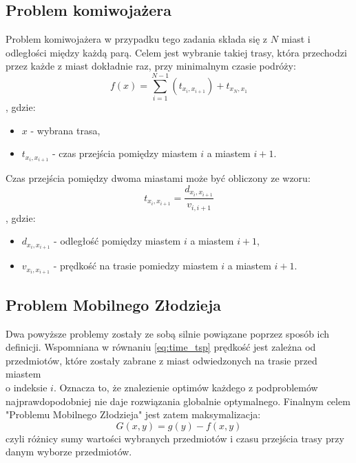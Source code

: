 \documentclass{article}
\begin{document}
	\subsection{Problem komiwojażera}
	Problem komiwojażera w przypadku tego zadania składa się z ${N}$ miast i odległości między każdą parą. Celem jest wybranie takiej trasy, która przechodzi przez każde z miast dokładnie raz, przy minimalnym czasie podróży:
	\begin{equation}\label{eq:min_tsp}
		f(x) = \sum\limits_{i=1}^{N-1}(t_{x_{i},x_{i+1}}) + t_{x_{N},x_{1}}
	\end{equation}
	, gdzie: 
	\begin{itemize}
		\item $x$ - wybrana trasa,
		\item $t_{x_{i},x_{i+1}}$ - czas przejścia pomiędzy miastem $i$ a miastem $i+1$.
	\end{itemize}
	Czas przejścia pomiędzy dwoma miastami może być obliczony ze wzoru:
	\begin{equation}\label{eq:time_tsp}
		t_{x_{i},x_{i+1}} = \dfrac{d_{x_{i}, x_{i+1}}}{v_{i, i+1}}
	\end{equation}
	, gdzie:
	\begin{itemize}
		\item $d_{x_{i},x_{i+1}}$ - odległość pomiędzy miastem $i$ a miastem $i+1$,
		\item $v_{x_{i},x_{i+1}}$ - prędkość na trasie pomiedzy miastem $i$ a miastem $i+1$.
	\end{itemize}
	\subsection{Problem Mobilnego Złodzieja}
	Dwa powyższe problemy zostały ze sobą silnie powiązane poprzez sposób ich definicji. Wspomniana w równaniu \ref{eq:time_tsp} prędkość jest zależna od przedmiotów, które zostały zabrane z miast odwiedzonych na trasie przed miastem \\o indeksie $i$. Oznacza to, że znalezienie optimów każdego z podproblemów najprawdopodobniej nie daje rozwiązania globalnie optymalnego. Finalnym celem "Problemu Mobilnego Złodzieja" jest zatem maksymalizacja:
	\begin{equation}\label{eq:fitness_function}
		G(x, y) = g(y) - f(x, y)
	\end{equation}
	czyli różnicy sumy wartości wybranych przedmiotów i czasu przejścia trasy przy danym wyborze przedmiotów.
	
\end{document}
